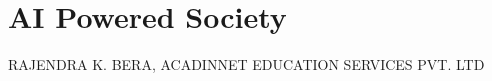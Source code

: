 \chapter{AI Powered Society}

\begin{center}
{\uppercase{Rajendra K. Bera, Acadinnet Education Services Pvt. Ltd}}

\smallskip

\end{center}
\vskip 4cm

\noindent{}

\newpage

